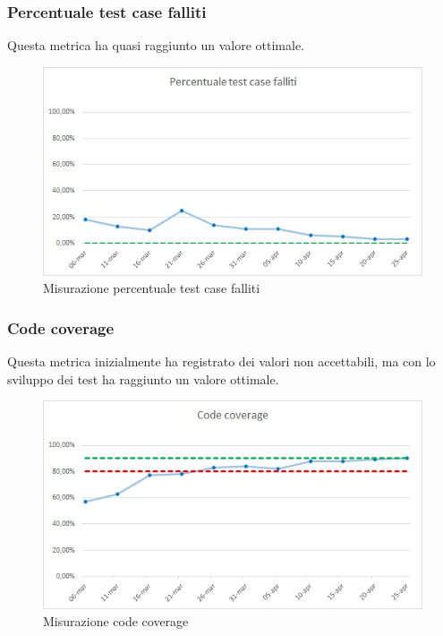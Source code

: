 \subsubsection{Percentuale test case falliti}
Questa metrica ha quasi raggiunto un valore ottimale.
\begin{figure} [H]
	\centering
	\includegraphics[scale=1]{Img/testNoPas}
	\caption{Misurazione percentuale test case falliti}\label{}
\end{figure}

\subsubsection{Code coverage}
Questa metrica inizialmente ha registrato dei valori non accettabili, ma con lo sviluppo dei test ha raggiunto un valore ottimale.
\begin{figure} [H]
	\centering
	\includegraphics[scale=1]{Img/CC}
	\caption{Misurazione code coverage}\label{}
\end{figure}

